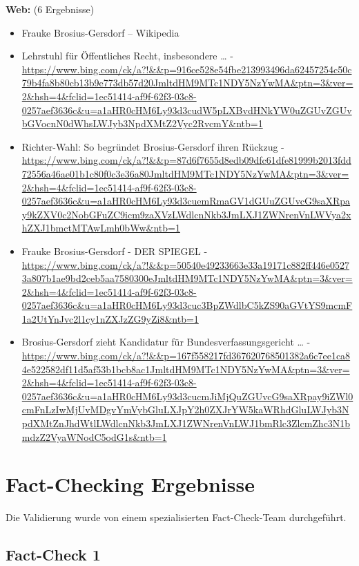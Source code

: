 \documentclass[12pt,a4paper]{article}
\begin{document}
\textbf{Web:} (6 Ergebnisse)
\begin{itemize}
\item Frauke Brosius-Gersdorf – Wikipedia
\item Lehrstuhl für Öffentliches Recht, insbesondere … - \url{https://www.bing.com/ck/a?!&&p=916ce528e54fbe213993496da62457254c50c79b4fa8b80cb13b9e773db57d20JmltdHM9MTc1NDY5NzYwMA&ptn=3&ver=2&hsh=4&fclid=1ec51414-af9f-62f3-03c8-0257aef3636c&u=a1aHR0cHM6Ly93d3cudW5pLXBvdHNkYW0uZGUvZGUvbGVocnN0dWhsLWJyb3NpdXMtZ2Vyc2RvcmY&ntb=1}
\item Richter-Wahl: So begründet Brosius-Gersdorf ihren Rückzug - \url{https://www.bing.com/ck/a?!&&p=87d6f7655d8edb09dfc61dfe81999b2013fdd72556a46ae01b1c80f0c3e36a80JmltdHM9MTc1NDY5NzYwMA&ptn=3&ver=2&hsh=4&fclid=1ec51414-af9f-62f3-03c8-0257aef3636c&u=a1aHR0cHM6Ly93d3cuemRmaGV1dGUuZGUvcG9saXRpay9kZXV0c2NobGFuZC9icm9zaXVzLWdlcnNkb3JmLXJ1ZWNrenVnLWVya2xhZXJ1bmctMTAwLmh0bWw&ntb=1}
\item Frauke Brosius-Gersdorf - DER SPIEGEL - \url{https://www.bing.com/ck/a?!&&p=50540e49233663e33a19171c882ff446e05273a807b1ae9bd2ceb5aa7580300eJmltdHM9MTc1NDY5NzYwMA&ptn=3&ver=2&hsh=4&fclid=1ec51414-af9f-62f3-03c8-0257aef3636c&u=a1aHR0cHM6Ly93d3cuc3BpZWdlbC5kZS90aGVtYS9mcmF1a2UtYnJvc2l1cy1nZXJzZG9yZi8&ntb=1}
\item Brosius-Gersdorf zieht Kandidatur für Bundesverfassungsgericht … - \url{https://www.bing.com/ck/a?!&&p=167f558217fd367620768501382a6c7ee1ca84e522582df11d5af53b1bcb8ac1JmltdHM9MTc1NDY5NzYwMA&ptn=3&ver=2&hsh=4&fclid=1ec51414-af9f-62f3-03c8-0257aef3636c&u=a1aHR0cHM6Ly93d3cucmJiMjQuZGUvcG9saXRpay9iZWl0cmFnLzIwMjUvMDgvYmVybGluLXJpY2h0ZXJrYW5kaWRhdGluLWJyb3NpdXMtZnJhdWtlLWdlcnNkb3JmLXJ1ZWNrenVnLWJ1bmRlc3ZlcmZhc3N1bmdzZ2VyaWNodC5odG1s&ntb=1}
\end{itemize}


\newpage
\section{Fact-Checking Ergebnisse}

Die Validierung wurde von einem spezialisierten Fact-Check-Team durchgeführt.


\subsection{Fact-Check 1}
\end{document}

